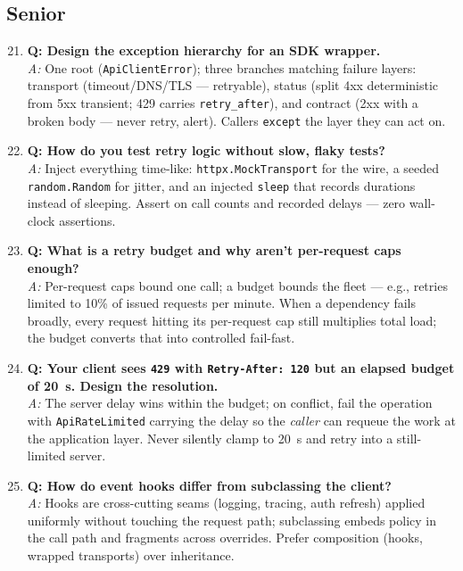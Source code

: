 \subsection{Senior}

\begin{enumerate}
  \setcounter{enumi}{20}
  \item \textbf{Q: Design the exception hierarchy for an SDK wrapper.}\\
        \textit{A:} One root (\texttt{ApiClientError}); three branches
        matching failure layers: transport (timeout/DNS/TLS --- retryable),
        status (split 4xx deterministic from 5xx transient; 429 carries
        \texttt{retry\_after}), and contract (2xx with a broken body ---
        never retry, alert). Callers \texttt{except} the layer they can act
        on.

  \item \textbf{Q: How do you test retry logic without slow, flaky tests?}\\
        \textit{A:} Inject everything time-like: \texttt{httpx.MockTransport}
        for the wire, a seeded \texttt{random.Random} for jitter, and an
        injected \texttt{sleep} that records durations instead of sleeping.
        Assert on call counts and recorded delays --- zero wall-clock
        assertions.

  \item \textbf{Q: What is a retry budget and why aren't per-request caps
        enough?}\\
        \textit{A:} Per-request caps bound one call; a budget bounds the
        fleet --- e.g., retries limited to 10\% of issued requests per
        minute. When a dependency fails broadly, every request hitting its
        per-request cap still multiplies total load; the budget converts that
        into controlled fail-fast.

  \item \textbf{Q: Your client sees \texttt{429} with \texttt{Retry-After:
        120} but an elapsed budget of 20~s. Design the resolution.}\\
        \textit{A:} The server delay wins within the budget; on conflict,
        fail the operation with \texttt{ApiRateLimited} carrying the delay so
        the \emph{caller} can requeue the work at the application layer.
        Never silently clamp to 20~s and retry into a still-limited server.

  \item \textbf{Q: How do event hooks differ from subclassing the client?}\\
        \textit{A:} Hooks are cross-cutting seams (logging, tracing, auth
        refresh) applied uniformly without touching the request path;
        subclassing embeds policy in the call path and fragments across
        overrides. Prefer composition (hooks, wrapped transports) over
        inheritance.


\end{enumerate}
